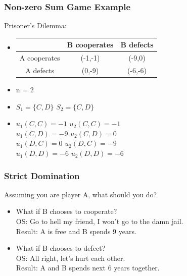 \documentclass{beamer}
\begin{document}
\begin{frame}
\frametitle{Non-zero Sum Game Example}
Prisoner's Dilemma:\\
\begin{itemize}
\item
\begin{tabular}{|c|c|c|}
\hline
\hline
    & B cooperates & B defects\\
\hline
A cooperates & (-1,-1) & (-9,0)\\
\hline
A defects & (0,-9) & (-6,-6)\\
\hline
\hline
\end{tabular}
\item
n = 2
\item
$S_1 = \{ C, D\}$  \qquad $S_2 = \{ C, D\}$
\item
$u_1(C,C) = -1$ \qquad $u_2(C,C) = -1$\\
$u_1(C,D) = -9$ \qquad $u_2(C,D) = 0$\\
$u_1(D,C) = 0 $ \text{ } \qquad $u_2(D,C) = -9$\\
$u_1(D,D) = -6$ \qquad $u_2(D,D) = -6$
\end{itemize}
\end{frame}

\begin{frame}
\frametitle{Strict Domination}
Assuming you are player A, what should you do?\\
\begin{itemize}
\item 
What if B chooses to cooperate?\\
OS: Go to hell my friend, I won't go to the damn jail.\\
Result: A is free and B spends 9 years.
\item
What if B chooses to defect?\\
OS: All right, let's hurt each other.\\
Result: A and B spends next 6 years together.
\end{itemize}
\end{frame}
\end{document}
